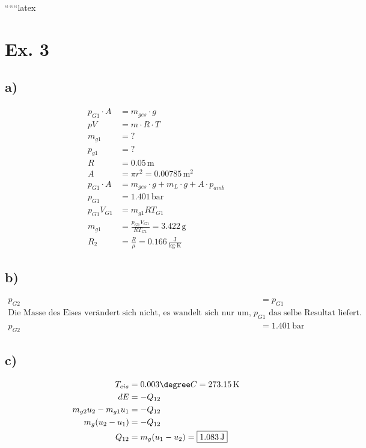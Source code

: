 
``````latex


\section*{Ex. 3}

\subsection*{a)}

\begin{align*}
    p_{G1} \cdot A &= m_{ges} \cdot g \\
    pV &= m \cdot R \cdot T \\
    m_{g1} &= ? \\
    p_{g1} &= ? \\
    R &= 0.05 \, \text{m} \\
    A &= \pi r^2 = 0.00785 \, \text{m}^2 \\
    p_{G1} \cdot A &= m_{ges} \cdot g + m_{L} \cdot g + A \cdot p_{amb} \\
    p_{G1} &= \boxed{1.401 \, \text{bar}} \\
    p_{G1} V_{G1} &= m_{g1} R T_{G1} \\
    m_{g1} &= \frac{p_{G1} V_{G1}}{R T_{G1}} = \boxed{3.422 \, \text{g}} \\
    R_2 &= \frac{R}{\mu} = 0.166 \, \frac{\text{J}}{\text{kg} \cdot \text{K}}
\end{align*}

\subsection*{b)}

\begin{align*}
    p_{G2} &= p_{G1} \\
    \text{Die Masse des Eises verändert sich nicht, es wandelt sich nur um, was dazu führt, dass die oben benutzte Formel für den nicht veränderten Druck } p_{G1} \text{ das selbe Resultat liefert.} \\
    p_{G2} &= \boxed{1.401 \, \text{bar}}
\end{align*}

\subsection*{c)}

\begin{align*}
    T_{eis} &= 0.003 \degree C = 273.15 \, \text{K} \\
    dE &= -Q_{12} \\
    m_{g2} u_2 - m_{g1} u_1 &= -Q_{12} \\
    m_{g} (u_2 - u_1) &= -Q_{12} \\
    Q_{12} &= m_{g} (u_1 - u_2) = \boxed{1.083 \, \text{J}}
\end{align*}

